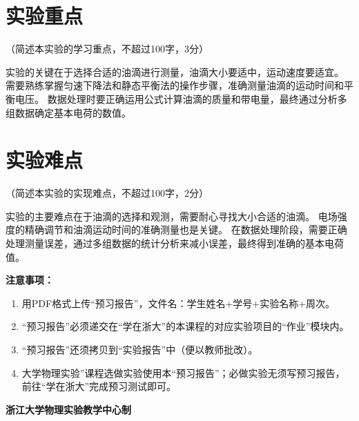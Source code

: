 \documentclass[10pt,a4paper]{ctexart}
\newcommand{\myspace}[1]{\par\vspace{#1\baselineskip}} %
\newcommand{\sihao}{\fontsize{14pt}{18pt}\selectfont}
\newcommand{\xiaosi}{\fontsize{12pt}{16pt}\selectfont}
\begin{document}
\myspace{2}
    
    \section{实验重点}
    
    \xiaosi（简述本实验的学习重点，不超过100字，3分）

实验的关键在于选择合适的油滴进行测量，油滴大小要适中，运动速度要适宜。
需要熟练掌握匀速下降法和静态平衡法的操作步骤，准确测量油滴的运动时间和平衡电压。
数据处理时要正确运用公式计算油滴的质量和带电量，最终通过分析多组数据确定基本电荷的数值。
    \myspace{2}
    
    \section{实验难点}

    \xiaosi（简述本实验的实现难点，不超过100字，2分）

实验的主要难点在于油滴的选择和观测，需要耐心寻找大小合适的油滴。
电场强度的精确调节和油滴运动时间的准确测量也是关键。
在数据处理阶段，需要正确处理测量误差，通过多组数据的统计分析来减小误差，最终得到准确的基本电荷值。
\myspace{2}


\newpage

\sihao\textbf{注意事项：}
\xiaosi
\begin{enumerate}
    \item 用PDF格式上传“预习报告”，文件名：学生姓名+学号+实验名称+周次。
    \item “预习报告”必须递交在“学在浙大”的本课程的对应实验项目的“作业”模块内。
    \item “预习报告”还须拷贝到“实验报告”中（便以教师批改）。
    \item 大学物理实验”课程选做实验使用本“预习报告”；必做实验无须写预习报告，前往“学在浙大”完成预习测试即可。
\end{enumerate}

\vspace{1cm}
\xiaosi\centering \textbf{浙江大学物理实验教学中心制}
\end{document}
